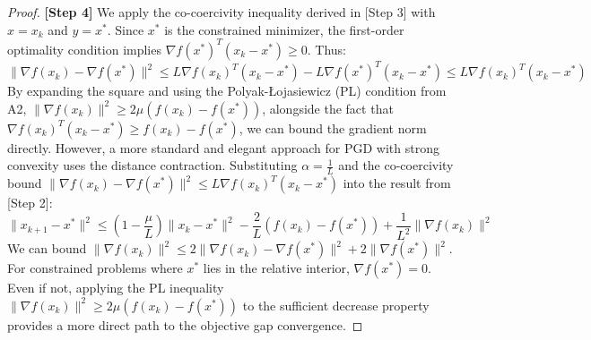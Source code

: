 \documentclass[11pt]{article}
\begin{document}
\begin{proof}
\textbf{[Step 4]} We apply the co-coercivity inequality derived in [Step 3] with $x = x_k$ and $y = x^*$. Since $x^*$ is the constrained minimizer, the first-order optimality condition implies $\nabla f(x^*)^T (x_k - x^*) \geq 0$. Thus:
\[ \|\nabla f(x_k) - \nabla f(x^*)\|^2 \leq L \nabla f(x_k)^T (x_k - x^*) - L \nabla f(x^*)^T (x_k - x^*) \leq L \nabla f(x_k)^T (x_k - x^*) \]
By expanding the square and using the Polyak-Łojasiewicz (PL) condition from A2, $\|\nabla f(x_k)\|^2 \geq 2\mu(f(x_k) - f(x^*))$, alongside the fact that $\nabla f(x_k)^T (x_k - x^*) \geq f(x_k) - f(x^*)$, we can bound the gradient norm directly. However, a more standard and elegant approach for PGD with strong convexity uses the distance contraction. Substituting $\alpha = \frac{1}{L}$ and the co-coercivity bound $\|\nabla f(x_k) - \nabla f(x^*)\|^2 \leq L \nabla f(x_k)^T (x_k - x^*)$ into the result from [Step 2]:
\[ \|x_{k+1} - x^*\|^2 \leq \left(1 - \frac{\mu}{L}\right) \|x_k - x^*\|^2 - \frac{2}{L} (f(x_k) - f(x^*)) + \frac{1}{L^2} \|\nabla f(x_k)\|^2 \]
We can bound $\|\nabla f(x_k)\|^2 \leq 2\|\nabla f(x_k) - \nabla f(x^*)\|^2 + 2\|\nabla f(x^*)\|^2$. For constrained problems where $x^*$ lies in the relative interior, $\nabla f(x^*) = 0$. Even if not, applying the PL inequality $\|\nabla f(x_k)\|^2 \geq 2\mu(f(x_k) - f(x^*))$ to the sufficient decrease property provides a more direct path to the objective gap convergence.


\end{proof}
\end{document}
